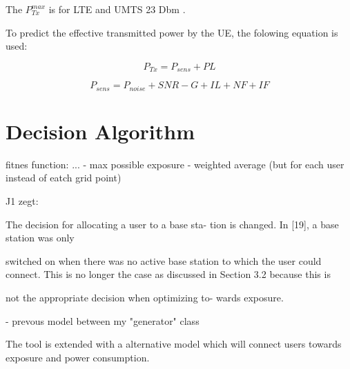 The $P^{max}_{Tx}$ is for LTE and UMTS 23 Dbm \cite{J11_maxTpxUE, J10_RDP}.

To predict the effective transmitted power by the \gls{UE}, the folowing equation is used:

\begin{equation}
P_{Tx} = P_{sens} + PL
\label{eq:ptx}
\end{equation}

\begin{equation}
P_{sens} = P_{noise} + SNR - G + IL + NF + IF
\label{eq:calculatepsens}
\end{equation}


\section{Decision Algorithm}

fitnes function: ...
- max possible exposure
- weighted average (but for each user instead of eatch grid point)

J1 zegt:

The decision for allocating a user to a base sta-
tion is changed. In [19], a base station was only

switched on when there was no active base station
to which the user could connect. This is no longer
the case as discussed in Section 3.2 because this is

not the appropriate decision when optimizing to-
wards exposure.


- prevous model between my "generator" class



The tool is extended with a alternative model which will connect users towards exposure and power consumption.

